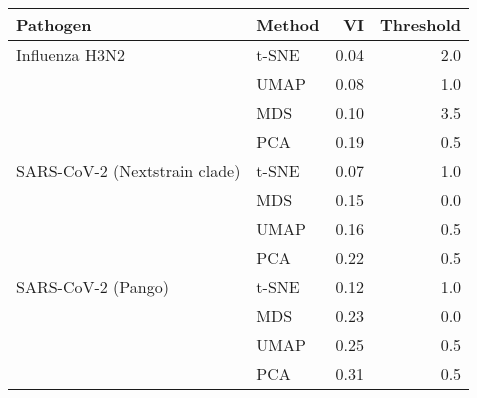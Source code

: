 \begin{tabular}{llrr}
\toprule
                     Pathogen & Method &   VI &  Threshold \\
\midrule
               Influenza H3N2 &  t-SNE & 0.04 &        2.0 \\
                              &   UMAP & 0.08 &        1.0 \\
                              &    MDS & 0.10 &        3.5 \\
                              &    PCA & 0.19 &        0.5 \\
SARS-CoV-2 (Nextstrain clade) &  t-SNE & 0.07 &        1.0 \\
                              &    MDS & 0.15 &        0.0 \\
                              &   UMAP & 0.16 &        0.5 \\
                              &    PCA & 0.22 &        0.5 \\
           SARS-CoV-2 (Pango) &  t-SNE & 0.12 &        1.0 \\
                              &    MDS & 0.23 &        0.0 \\
                              &   UMAP & 0.25 &        0.5 \\
                              &    PCA & 0.31 &        0.5 \\
\bottomrule
\end{tabular}
